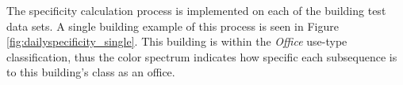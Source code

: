 The specificity calculation process is implemented on each of the building test data sets. A single building example of this process is seen in Figure \ref{fig:dailyspecificity_single}. This building is within the \emph{Office} use-type classification, thus the color spectrum indicates how specific each subsequence is to this building's class as an office.